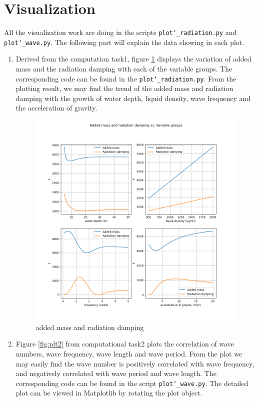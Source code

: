 \documentclass{article}
\begin{document}
\section{Visualization}
All the visualization work are doing in the scripts \texttt{plot\char`_radiation.py} and \texttt{plot\char`_wave.py}. The following part will explain the data showing in each plot.
\begin{enumerate}
    \item Derived from the computation task1, figure \ref{fig:plt1} displays the variation of added mass and the radiation damping with each of the variable groups. The corresponding code can be found in the \texttt{plot\char`_radiation.py}. From the plotting result, we may find the trend of the added mass and radiation damping with the growth of water depth, liquid density, wave frequency and the acceleration of gravity.
    \begin{figure}[!htb]
        \centering
        \includegraphics[width=1\textwidth]{img/1_radiation.png}
        \caption{added mass and radiation damping}
        \label{fig:plt1}
    \end{figure}
    \item Figure \ref{fig:plt2} from computational task2 plots the correlation of wave numbers, wave frequency, wave length and wave period. From the plot we may easily find the wave number is positively correlated with wave frequency, and negatively correlated with wave period and wave length. The corresponding code can be found in the script \texttt{plot\char`_wave.py}. The detailed plot can be viewed in Matplotlib by rotating the plot object.

\end{enumerate}
\end{document}
